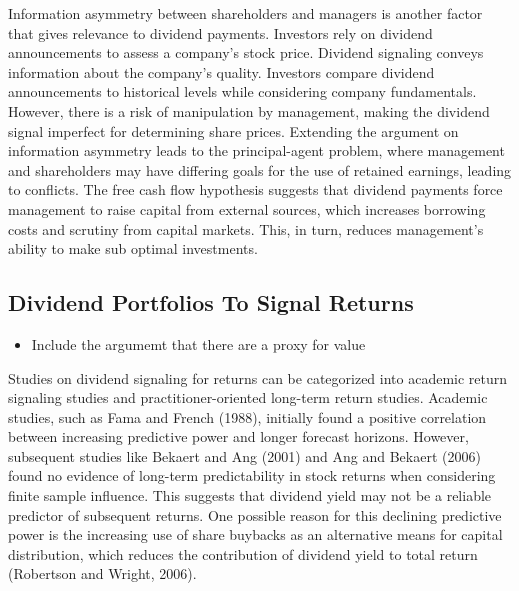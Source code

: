 \documentclass[11pt,preprint, authoryear]{elsarticle}
\numberwithin{equation}{section}
\numberwithin{figure}{section}
\numberwithin{table}{section}
\def\tightlist{} %
\begin{document}
Information asymmetry between shareholders and managers is another
factor that gives relevance to dividend payments. Investors rely on
dividend announcements to assess a company's stock price. Dividend
signaling conveys information about the company's quality. Investors
compare dividend announcements to historical levels while considering
company fundamentals. However, there is a risk of manipulation by
management, making the dividend signal imperfect for determining share
prices. Extending the argument on information asymmetry leads to the
principal-agent problem, where management and shareholders may have
differing goals for the use of retained earnings, leading to conflicts.
The free cash flow hypothesis suggests that dividend payments force
management to raise capital from external sources, which increases
borrowing costs and scrutiny from capital markets. This, in turn,
reduces management's ability to make sub optimal investments.

\hypertarget{dividend-portfolios-to-signal-returns}{%
\subsection{Dividend Portfolios To Signal
Returns}\label{dividend-portfolios-to-signal-returns}}

\begin{itemize}
\tightlist
\item
  Include the argumemt that there are a proxy for value
\end{itemize}

Studies on dividend signaling for returns can be categorized into
academic return signaling studies and practitioner-oriented long-term
return studies. Academic studies, such as Fama and French (1988),
initially found a positive correlation between increasing predictive
power and longer forecast horizons. However, subsequent studies like
Bekaert and Ang (2001) and Ang and Bekaert (2006) found no evidence of
long-term predictability in stock returns when considering finite sample
influence. This suggests that dividend yield may not be a reliable
predictor of subsequent returns. One possible reason for this declining
predictive power is the increasing use of share buybacks as an
alternative means for capital distribution, which reduces the
contribution of dividend yield to total return (Robertson and Wright,
2006).
\end{document}
